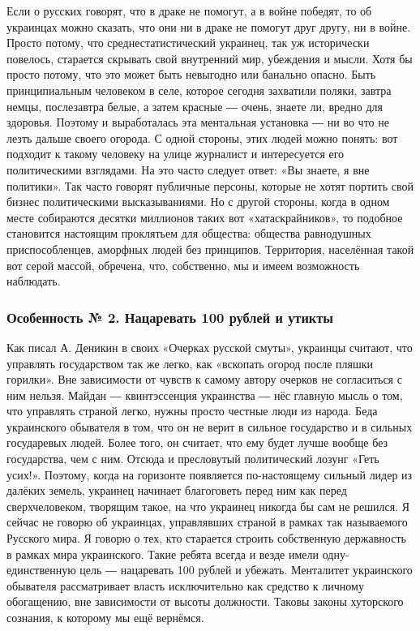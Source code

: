 Если о русских говорят, что в драке не помогут, а в войне победят, то об
украинцах можно сказать, что они ни в драке не помогут друг другу, ни в войне.
Просто потому, что среднестатистический украинец, так уж исторически повелось,
старается скрывать свой внутренний мир, убеждения и мысли. Хотя бы просто
потому, что это может быть невыгодно или банально опасно. Быть принципиальным
человеком в селе, которое сегодня захватили поляки, завтра немцы, послезавтра
белые, а затем красные ― очень, знаете ли, вредно для здоровья. Поэтому и
выработалась эта ментальная установка ― ни во что не лезть дальше своего
огорода. С одной стороны, этих людей можно понять: вот подходит к такому
человеку на улице журналист и интересуется его политическими взглядами. На это
часто следует ответ: «Вы знаете, я вне политики». Так часто говорят публичные
персоны, которые не хотят портить свой бизнес политическими высказываниями. Но
с другой стороны, когда в одном месте собираются десятки миллионов таких вот
«хатаскрайников», то подобное становится настоящим проклятьем для общества:
общества равнодушных приспособленцев, аморфных людей без принципов. Территория,
населённая такой вот серой массой, обречена, что, собственно, мы и имеем
возможность наблюдать.

\subsubsection{Особенность № 2. Нацаревать 100 рублей и утикты}

Как писал А. Деникин в своих «Очерках русской смуты», украинцы считают, что
управлять государством так же легко, как «вскопать огород после пляшки
горилки». Вне зависимости от чувств к самому автору очерков не согласиться с
ним нельзя. Майдан ― квинтэссенция украинства ― нёс главную мысль о том, что
управлять страной легко, нужны просто честные люди из народа. Беда украинского
обывателя в том, что он не верит в сильное государство и в сильных государевых
людей. Более того, он считает, что ему будет лучше вообще без государства, чем
с ним. Отсюда и пресловутый политический лозунг «Геть усих!». Поэтому, когда на
горизонте появляется по-настоящему сильный лидер из далёких земель, украинец
начинает благоговеть перед ним как перед сверхчеловеком, творящим такое, на что
украинец никогда бы сам не решился. Я сейчас не говорю об украинцах,
управлявших страной в рамках так называемого Русского мира. Я говорю о тех, кто
старается строить собственную державность в рамках мира украинского. Такие
ребята всегда и везде имели одну-единственную цель ― нацаревать 100 рублей и
убежать. Менталитет украинского обывателя рассматривает власть исключительно
как средство к личному обогащению, вне зависимости от высоты должности. Таковы
законы хуторского сознания, к которому мы ещё вернёмся.

